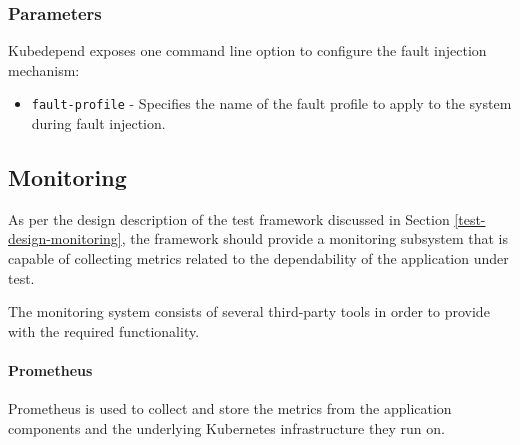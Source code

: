 \subsubsection{Parameters}

Kubedepend exposes one command line option to configure the fault injection mechanism:

\begin{itemize}
	\item \texttt{fault-profile} - Specifies the name of the fault profile to apply to the system during fault injection.
\end{itemize}

\subsection{Monitoring} \label{test-impl-monitoring}

%	
%	

As per the design description of the test framework discussed in Section \ref{test-design-monitoring}, the framework should provide a monitoring subsystem that is capable of collecting metrics related to the dependability of the application under test.

The monitoring system consists of several third-party tools in order to provide with the required functionality.

\paragraph{Prometheus} Prometheus is used to collect and store the metrics from the application components and the underlying Kubernetes infrastructure they run on.

